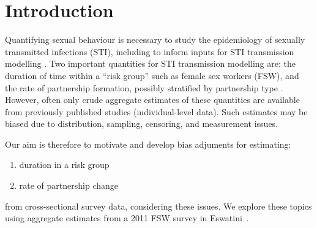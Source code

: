 \section{Introduction}
Quantifying sexual behaviour
is necessary to study the epidemiology of sexually transmitted infections (STI),
including to inform inputs for STI transmission modelling \cite{Fenton2001}.
Two important quantities for STI transmission modelling are:
the duration of time within a ``risk group'' such as female sex workers (FSW), and
the rate of partnership formation, possibly stratified by partnership type
\cite{Garnett1996,Stigum1997,Henry2015,Knight2020}.
However, often only crude aggregate estimates of these quantities are available
from previously published studies (\vs individual-level data).
Such estimates may be biased due to distribution, sampling, censoring, and measurement issues.
\par
Our aim is therefore to motivate and develop bias adjuments for estimating:
\begin{enumerate}
  \item duration in a risk group
  \item rate of partnership change
\end{enumerate}
from cross-sectional survey data, considering these issues.
We explore these topics using aggregate estimates from
a 2011 FSW survey in Eswatini~\cite{Baral2014}.

